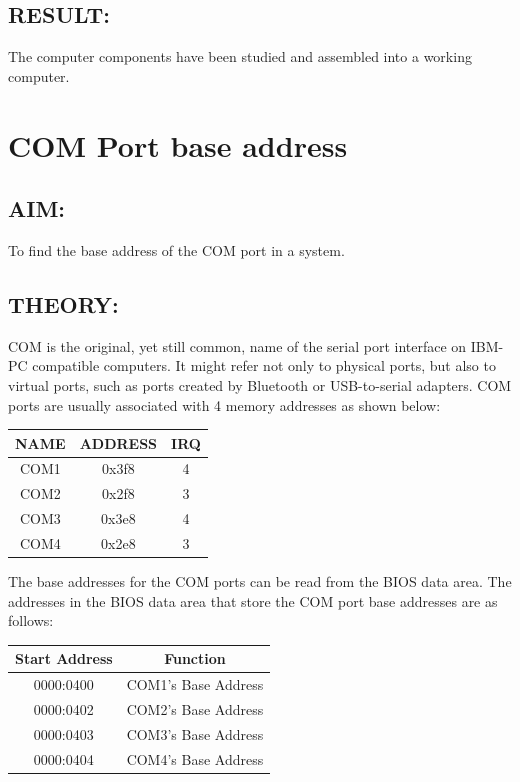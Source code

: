 \documentclass[a4paper,28pt]{report}
\begin{document}
\section*{RESULT:}
The computer components have been studied and assembled into a working computer.
%
%
%
%
%

\chapter{COM Port base address}
%
%
\section*{AIM:}
To find the base address of the COM port in a system.
\section*{THEORY:}
COM is the original, yet still common, name of the serial port interface on IBM-PC compatible computers. It might refer not only to physical ports, but also to virtual ports, such as ports created by Bluetooth or USB-to-serial adapters. COM ports are usually associated with 4 memory addresses as shown below:

\begin{center}
\bgroup
\def\arraystretch{1.5}
\begin{tabular}{ |c|c|c| }
\hline
\textbf{NAME} & \textbf{ADDRESS} & \textbf{IRQ}\\
\hline
COM1 & 0x3f8 & 4\\
\hline
COM2 & 0x2f8 & 3\\
\hline
COM3 & 0x3e8 & 4\\
\hline
COM4 & 0x2e8 & 3\\
\hline
\end{tabular}
\egroup
\end{center}

The base addresses for the COM ports can be read from the BIOS data area. The addresses in the BIOS data
area that store the COM port base addresses are as follows:

\begin{center}
\bgroup
\def\arraystretch{1.5}
\begin{tabular}{ |c|c| }
\hline
\textbf{Start Address} & \textbf{Function}\\
\hline
0000:0400 & COM1's Base Address\\
\hline
0000:0402 & COM2's Base Address\\
\hline
0000:0403 & COM3's Base Address\\
\hline
0000:0404 & COM4's Base Address\\
\hline
\end{tabular}
\egroup
\end{center}
\end{document}

